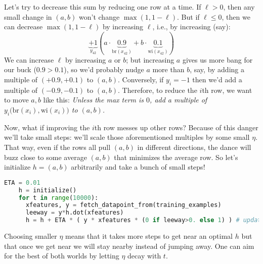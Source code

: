   Let's try to decrease this sum by reducing one row  at a time.
  If $\ell>0$, then
  any small change in $(a,b)$ won't change $\max(1,1-\ell)$.
  But if $\ell\leq 0$, then we can decrease $\max(1,1-\ell)$ by increasing
  $\ell$, i.e., by increasing (say):
  $$
    \underbrace{+1}_{y_{42}}  (a \cdot \underbrace{0.9}_{\text{br}(x_{42})} + b \cdot\underbrace{0.1}_{\text{wi}(x_{42})})
  $$
  We can increase $\ell$ by increasing $a$ or $b$; but increasing $a$ gives us
  more bang for our buck ($0.9>0.1$), so we'd probably nudge $a$ more than $b$,
  say, by adding a multiple of $(+0.9, +0.1)$ to $(a, b)$.  Conversely, if
  ${y_i=-1}$ then we'd add a multiple of $(-0.9, -0.1)$ to $(a, b)$.
  Therefore, to reduce the $i$th row, we want to move $a, b$ like this:
    \emph{Unless the max term is $0$,
      add a multiple of $y_i ({\text{br}(x_{i})}, {\text{wi}(x_{i}))}$ to $(a,b)$.}

  Now, what if improving the $i$th row messes up other rows?  Because of this
  danger we'll take small steps: we'll scale those aforementioned multiples
  by some small $\eta$.  That way, even if the rows all pull
  $(a,b)$ in different directions, the dance will buzz close to some average
  $(a,b)$ that minimizes the average row.  So let's initialize
  $h=(a,b)$ arbitrarily and take a bunch of small steps!
  \begin{lstlisting}[language=Python, basicstyle=\footnotesize\ttfamily]
    ETA = 0.01
    h = initialize()
    for t in range(10000):
      xfeatures, y = fetch_datapoint_from(training_examples)
      leeway = y*h.dot(xfeatures)
      h = h + ETA * ( y * xfeatures * (0 if leeway>0. else 1) ) # update
  \end{lstlisting}
  Choosing smaller $\eta$ means that it takes more steps to get near an optimal
  $h$ but that once we get near we will stay nearby instead of jumping away.
  One can aim for the best of both worlds by letting $\eta$ decay with $t$.

  \newpage
{}

